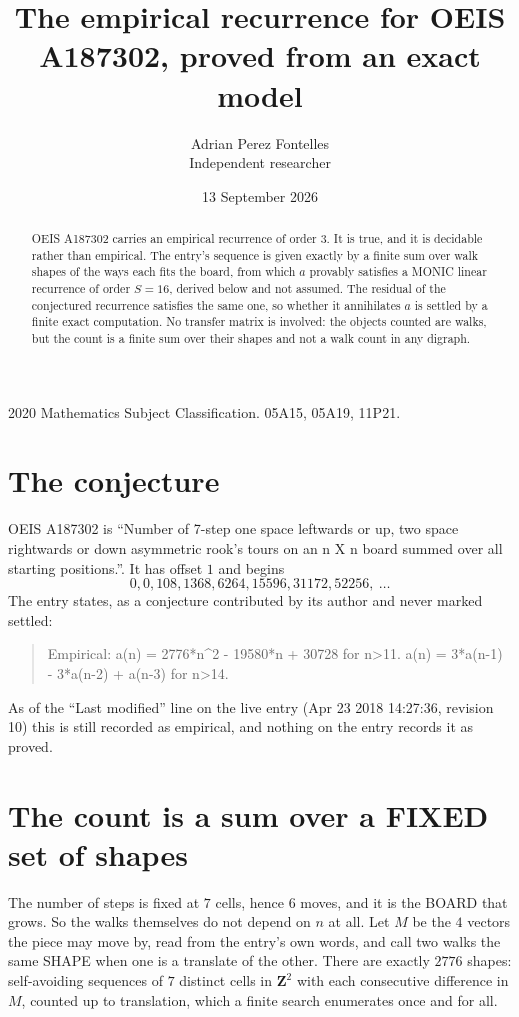 \documentclass[11pt,a4paper]{article}
\title{The empirical recurrence for OEIS A187302, proved from an exact model}
\author{Adrian Perez Fontelles\\ \small Independent researcher}
\date{13 September 2026}
\theoremstyle{plain}
\theoremstyle{definition}
\begin{document}
\maketitle

\begin{abstract}
OEIS A187302 carries an empirical recurrence of order $3$. It is true, and it is
decidable rather than empirical. The entry's sequence is given exactly by a finite sum over walk shapes of the ways each fits the board, from
which $a$ provably satisfies a MONIC linear recurrence of order $S=16$, derived below and not
assumed. The residual of the conjectured recurrence satisfies the same one, so whether it
annihilates $a$ is settled by a finite exact computation. No transfer matrix is involved: the objects counted are walks, but the count is a finite sum over their shapes and not a walk count in any digraph.
\end{abstract}

\noindent\small 2020 Mathematics Subject Classification. 05A15, 05A19, 11P21.\normalsize

\section{The conjecture}

OEIS A187302 is ``Number of 7-step one space leftwards or up, two space rightwards or down asymmetric rook's tours on an n X n board summed over all starting positions.''. It has offset $1$ and begins
\[
0, 0, 108, 1368, 6264, 15596, 31172, 52256,\ \dots
\]
The entry states, as a conjecture contributed by its author and never marked settled:
\begin{quote}
Empirical: a(n) = 2776*n\^{}2 - 19580*n + 30728 for n>11. a(n) = 3*a(n-1) - 3*a(n-2) + a(n-3) for n>14.
\end{quote}
As of the ``Last modified'' line on the live entry (Apr 23 2018 14:27:36, revision 10)
this is still recorded as empirical, and nothing on the entry records it as proved.

\section{The count is a sum over a FIXED set of shapes}

The number of steps is fixed at $7$ cells, hence $6$ moves, and it is the BOARD
that grows. So the walks themselves do not depend on $n$ at all. Let $M$ be the $4$
vectors the piece may move by, read from the entry's own words, and call two walks the same
SHAPE when one is a translate of the other. There are exactly $2776$ shapes: self-avoiding
sequences of $7$ distinct cells in $\mathbf{Z}^{2}$ with each consecutive difference in
$M$, counted up to translation, which a finite search enumerates once and for all.
\end{document}
